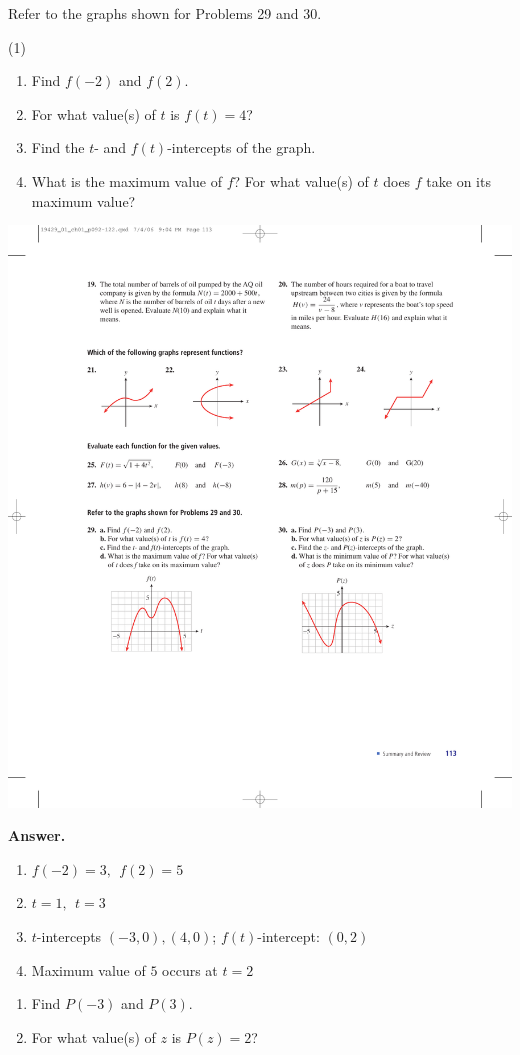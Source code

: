 \documentclass[10pt,]{book}
\theoremstyle{plain}
\theoremstyle{definition}
\theoremstyle{definition}
\theoremstyle{definition}
\theoremstyle{definition}
\numberwithin{equation}{part}
\begin{document}
\begin{exerciselist}
\hypertarget{exercisegroup-56}{}\par\noindent Refer to the graphs shown for Problems 29 and 30.%
\begin{exercisegroup}(1)
\exercise[29.]\hypertarget{exercise-425}{}\leavevmode%
\begin{enumerate}[label=*\alph**]
\item\hypertarget{li-1565}{}Find \(f (-2)\) and \(f (2)\).%
\item\hypertarget{li-1566}{}For what value(s) of \(t\) is \(f (t) = 4\)?%
\item\hypertarget{li-1567}{}Find the \(t\)- and \(f(t)\)-intercepts of the graph.%
\item\hypertarget{li-1568}{}What is the maximum value of \(f\)? For what value(s) of \(t\) does \(f\) take on its maximum value?%
\end{enumerate}
 \includegraphics[width=0.45\linewidth]{images/fig-chap1-rev-29}
%
\par\smallskip
\noindent\textbf{Answer.}\hypertarget{answer-236}{}\quad
\leavevmode%
\begin{enumerate}[label=*\alph**]
\item\hypertarget{li-1569}{}\(f (-2) = 3, ~~f (2) = 5\)%
\item\hypertarget{li-1570}{}\(t = 1, ~~t = 3\)%
\item\hypertarget{li-1571}{}\(t\)-intercepts \((-3, 0), (4, 0)\); \(f (t)\)-intercept: \((0, 2)\)%
\item\hypertarget{li-1572}{}Maximum value of \(5\) occurs at \(t = 2\)%
\end{enumerate}
%
\exercise[30.]\hypertarget{exercise-426}{}\leavevmode%
\begin{enumerate}[label=*\alph**]
\item\hypertarget{li-1573}{}Find \(P(-3)\) and \(P(3)\).%
\item\hypertarget{li-1574}{}For what value(s) of \(z\) is \(P(z) = 2\)?%

\end{enumerate}
\end{exercisegroup}
\end{exerciselist}
\end{document}
